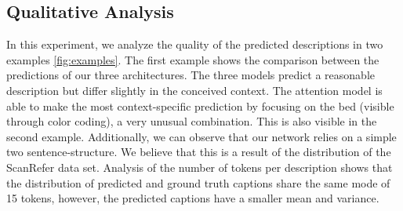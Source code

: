 \documentclass[10pt,twocolumn,letterpaper]{article}
\begin{document}
\subsection{Qualitative Analysis}
In this experiment, we analyze the quality of the predicted descriptions in two examples \autoref{fig:examples}. 
The first example shows the comparison between the predictions of our three architectures. The three models predict a reasonable description but differ slightly in the conceived context. The attention model is able to make the most context-specific prediction by focusing on the bed (visible through color coding), a very unusual combination. This is also visible in the second example. Additionally, we can observe that our network relies on a simple two sentence-structure. We believe that this is a result of the distribution of the ScanRefer data set. Analysis of the number of tokens per description shows that the distribution of predicted and ground truth captions share the same mode of 15 tokens, however, the predicted captions have a smaller mean and variance.
\end{document}
